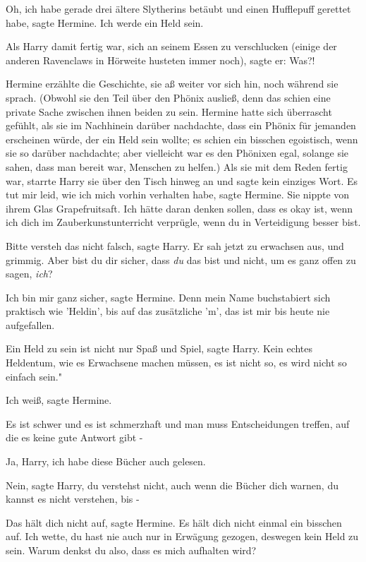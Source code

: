 \glqq Oh, ich habe gerade drei ältere Slytherins betäubt und einen Hufflepuff
gerettet habe\grqq{}, sagte Hermine. \glqq Ich werde ein Held sein.\grqq{}

Als Harry damit fertig war, sich an seinem Essen zu verschlucken (einige der
anderen Ravenclaws in Hörweite husteten immer noch), sagte er: \glqq
Was?!\grqq{}

Hermine erzählte die Geschichte, sie aß weiter vor sich hin, noch während sie
sprach. (Obwohl sie den Teil über den Phönix ausließ, denn das schien eine
private Sache zwischen ihnen beiden zu sein. Hermine hatte sich überrascht
gefühlt, als sie im Nachhinein darüber nachdachte, dass ein Phönix für jemanden
erscheinen würde, der ein Held sein wollte; es schien ein bisschen egoistisch,
wenn sie so darüber nachdachte; aber vielleicht war es den Phönixen egal,
solange sie sahen, dass man bereit war, Menschen zu helfen.) Als sie mit dem
Reden fertig war, starrte Harry sie über den Tisch hinweg an und sagte kein
einziges Wort. \glqq Es tut mir leid, wie ich mich vorhin verhalten habe\grqq{},
sagte Hermine. Sie nippte von ihrem Glas Grapefruitsaft. \glqq Ich hätte daran
denken sollen, dass es okay ist, wenn ich dich im Zauberkunstunterricht
verprügle, wenn du in Verteidigung besser bist.\grqq{}

\glqq Bitte versteh das nicht falsch\grqq{}, sagte Harry. Er sah jetzt zu
erwachsen aus, und grimmig. \glqq Aber bist du dir sicher, dass \emph{du} das
bist und nicht, um es ganz offen zu sagen, \emph{ich}?\grqq{}

\glqq Ich bin mir ganz sicher\grqq{}, sagte Hermine. \glqq Denn mein Name
buchstabiert sich praktisch wie 'Heldin', bis auf das zusätzliche 'm', das ist
mir bis heute nie aufgefallen.\grqq{}

\glqq Ein Held zu sein ist nicht nur Spaß und Spiel\grqq{}, sagte Harry. \glqq
Kein echtes Heldentum, wie es Erwachsene machen müssen, es ist nicht so, es wird
nicht so einfach sein."

\glqq Ich weiß\grqq{}, sagte Hermine.

\glqq Es ist schwer und es ist schmerzhaft und man muss Entscheidungen treffen,
auf die es keine gute Antwort gibt -\grqq{}

\glqq Ja, Harry, ich habe diese Bücher auch gelesen.\grqq{}

\glqq Nein\grqq{}, sagte Harry, \glqq du verstehst nicht, auch wenn die Bücher
dich warnen, du kannst es nicht verstehen, bis -\grqq{}

\glqq Das hält dich nicht auf\grqq{}, sagte Hermine. \glqq Es hält dich nicht
einmal ein bisschen auf. Ich wette, du hast nie auch nur in Erwägung gezogen,
deswegen kein Held zu sein. Warum denkst du also, dass es mich aufhalten
wird?\grqq{}

